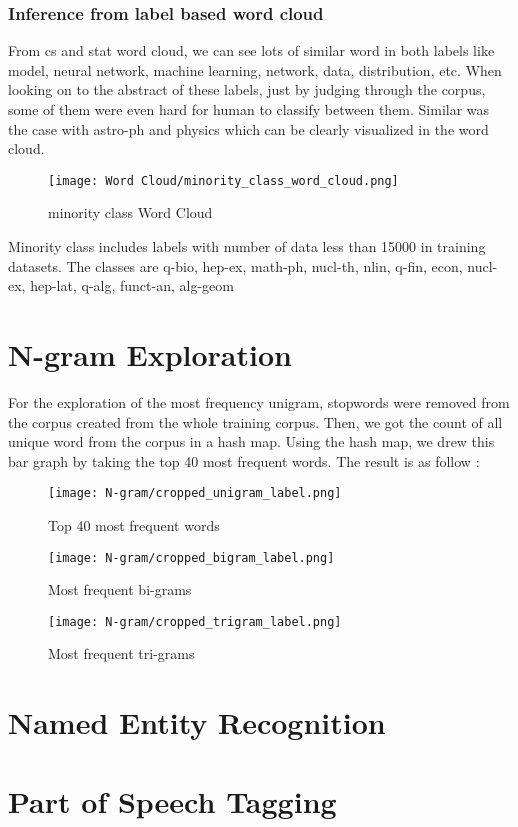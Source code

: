 \subsubsection{Inference from label based word cloud}
From cs and stat word cloud, we can see lots of similar word in both labels like model, neural network, machine learning, network, data, distribution, etc. When looking on to the abstract of these labels, just by judging through the corpus, some of them were even hard for human to classify between them. Similar was the case with astro-ph and  physics which can be clearly visualized in the word cloud.

\begin{figure}[H]
    \centering
    \texttt{[image: Word Cloud/minority\_class\_word\_cloud.png]}
    \caption{minority class Word Cloud}
    \label{fig:minority class Corpus Word Cloud}
\end{figure}

Minority class includes labels with number of data less than 15000 in training datasets. The classes are q-bio, hep-ex,
math-ph, nucl-th, nlin, q-fin, econ, nucl-ex, hep-lat, q-alg, funct-an,
alg-geom

\section{N-gram Exploration}
For the exploration of the most frequency unigram, stopwords were removed from the corpus created from the whole training corpus. Then, we got the count of all unique word from the corpus in a hash map. Using the hash map, we drew this bar graph by taking the top 40 most frequent words. The result is as follow : 

\begin{figure}[H]
    \centering
    \texttt{[image: N-gram/cropped\_unigram\_label.png]}
    \caption{Top 40 most frequent words}
    \label{fig:Top 40 most frequent words}
\end{figure}



\begin{figure}[H]
    \centering
    \texttt{[image: N-gram/cropped\_bigram\_label.png]}
    \caption{Most frequent bi-grams}
    \label{fig:Most frequent bi-grams}
\end{figure}

\begin{figure}[H]
    \centering
    \texttt{[image: N-gram/cropped\_trigram\_label.png]}
    \caption{Most frequent tri-grams}
    \label{fig:Most frequent tri-grams}
\end{figure}



\section{Named Entity Recognition}
\section{Part of Speech Tagging}


